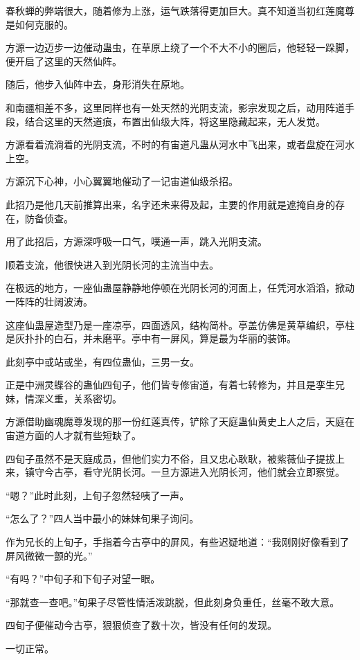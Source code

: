 \begin{this_body}
春秋蝉的弊端很大，随着修为上涨，运气跌落得更加巨大。真不知道当初红莲魔尊是如何克服的。

方源一边迈步一边催动蛊虫，在草原上绕了一个不大不小的圈后，他轻轻一跺脚，便开启了这里的天然仙阵。

随后，他步入仙阵中去，身形消失在原地。

和南疆相差不多，这里同样也有一处天然的光阴支流，影宗发现之后，动用阵道手段，结合这里的天然道痕，布置出仙级大阵，将这里隐藏起来，无人发觉。

方源看着流淌着的光阴支流，不时的有宙道凡蛊从河水中飞出来，或者盘旋在河水上空。

方源沉下心神，小心翼翼地催动了一记宙道仙级杀招。

此招乃是他几天前推算出来，名字还未来得及起，主要的作用就是遮掩自身的存在，防备侦查。

用了此招后，方源深呼吸一口气，噗通一声，跳入光阴支流。

顺着支流，他很快进入到光阴长河的主流当中去。

在极远的地方，一座仙蛊屋静静地停顿在光阴长河的河面上，任凭河水滔滔，掀动一阵阵的壮阔波涛。

这座仙蛊屋造型乃是一座凉亭，四面透风，结构简朴。亭盖仿佛是黄草编织，亭柱是灰扑扑的白石，并未磨平。亭中有一屏风，算是最为华丽的装饰。

此刻亭中或站或坐，有四位蛊仙，三男一女。

正是中洲灵蝶谷的蛊仙四旬子，他们皆专修宙道，有着七转修为，并且是孪生兄妹，情深义重，关系密切。

方源借助幽魂魔尊发现的那一份红莲真传，铲除了天庭蛊仙黄史上人之后，天庭在宙道方面的人才就有些短缺了。

四旬子虽然不是天庭成员，但他们实力不俗，且又忠心耿耿，被紫薇仙子提拔上来，镇守今古亭，看守光阴长河。一旦方源进入光阴长河，他们就会立即察觉。

“嗯？”此时此刻，上旬子忽然轻咦了一声。

“怎么了？”四人当中最小的妹妹旬果子询问。

作为兄长的上旬子，手指着今古亭中的屏风，有些迟疑地道：“我刚刚好像看到了屏风微微一颤的光。”

“有吗？”中旬子和下旬子对望一眼。

“那就查一查吧。”旬果子尽管性情活泼跳脱，但此刻身负重任，丝毫不敢大意。

四旬子便催动今古亭，狠狠侦查了数十次，皆没有任何的发现。

一切正常。


\end{this_body}
